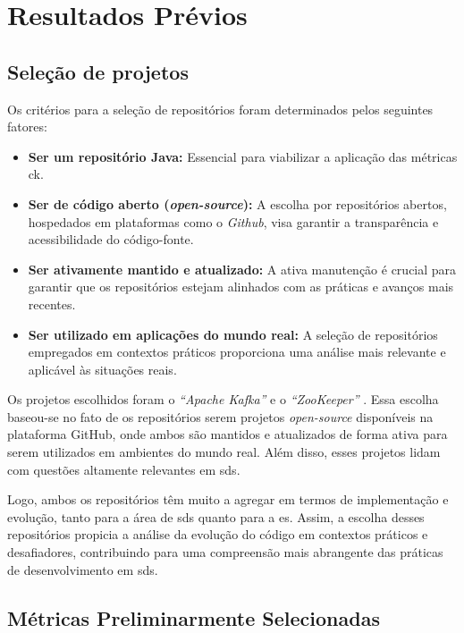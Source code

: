 \chapter{Resultados Prévios}
\label{cap:resultados}

\section{Seleção de projetos}

Os critérios para a seleção de repositórios foram determinados pelos seguintes fatores:

\begin{itemize}
    \item \textbf{Ser um repositório Java:} Essencial para viabilizar a aplicação das métricas \gls{ck}.
    \item \textbf{Ser de código aberto (\textit{open-source}):} A escolha por repositórios abertos, hospedados em plataformas como o \textit{Github}, visa garantir a transparência e acessibilidade do código-fonte.
    \item \textbf{Ser ativamente mantido e atualizado:} A ativa manutenção é crucial para garantir que os repositórios estejam alinhados com as práticas e avanços mais recentes.
    \item \textbf{Ser utilizado em aplicações do mundo real:} A seleção de repositórios empregados em contextos práticos proporciona uma análise mais relevante e aplicável às situações reais.
\end{itemize}

Os projetos escolhidos foram o \textit{``Apache Kafka''} \cite{KafkaGitHub} e o \textit{``ZooKeeper''} \cite{ZookeeperGitHub}. Essa escolha baseou-se no fato de os repositórios serem projetos \textit{open-source} disponíveis na plataforma GitHub, onde ambos são mantidos e atualizados de forma ativa para serem utilizados em ambientes do mundo real. Além disso, esses projetos lidam com questões altamente relevantes em \gls{sds}.

Logo, ambos os repositórios têm muito a agregar em termos de implementação e evolução, tanto para a área de \gls{sds} quanto para a \gls{es}. Assim, a escolha desses repositórios propicia a análise da evolução do código em contextos práticos e desafiadores, contribuindo para uma compreensão mais abrangente das práticas de desenvolvimento em \gls{sds}.

\section{Métricas Preliminarmente Selecionadas}


